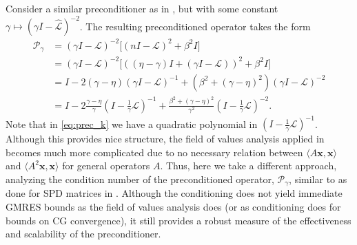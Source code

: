 \documentclass[review]{siamart}
\begin{document}
Consider a similar preconditioner as in
, but with some constant $\gamma \mapsto
(\gamma I - \widehat{\mathcal{L}})^{-2}$. The resulting preconditioned
operator takes the form
%
\begin{align}\nonumber
\mathcal{P}_\gamma & =
(\gamma I - \mathcal{L})^{-2}\Big[(nI - \mathcal{L})^2 + \beta^2 I\Big] \\ \nonumber
& = (\gamma I - \mathcal{L})^{-2}\Big[((\eta-\gamma)I + (\gamma I - \mathcal{L}))^2 + \beta^2 I\Big] \\
& = I - 2(\gamma-\eta)(\gamma I - \mathcal{L})^{-1} + (\beta^2 + (\gamma-\eta)^2)(\gamma I -
	\mathcal{L})^{-2} \nonumber\\
& = I - 2\frac{\gamma-\eta}{\gamma}\left(I - \tfrac{1}{\gamma}\mathcal{L}\right)^{-1} +
	\frac{\beta^2 + (\gamma-\eta)^2}{\gamma^2}
	\left(I - \tfrac{1}{\gamma}\mathcal{L}\right)^{-2}.\label{eq:prec_k}
\end{align}
%
Note that in \eqref{eq:prec_k} we have a quadratic polynomial in
$(I - \tfrac{1}{\gamma}\mathcal{L})^{-1}$. Although this provides
nice structure, the field of values analysis applied in 
becomes much more complicated due to no necessary relation between
$\langle A\mathbf{x},\mathbf{x}\rangle$ and
$\langle A^2\mathbf{x},\mathbf{x}\rangle$ for general operators $A$. Thus, here
we take a different approach, analyzing the condition number of the preconditioned
operator, $\mathcal{P}_\gamma$, similar to as done for SPD matrices in \cite{exh}.
Although the conditioning does not yield immediate GMRES bounds as the field of values
analysis does (or as conditioning does for bounds on CG convergence), it still
provides a robust measure of the effectiveness and scalability of the
preconditioner.
\end{document}
